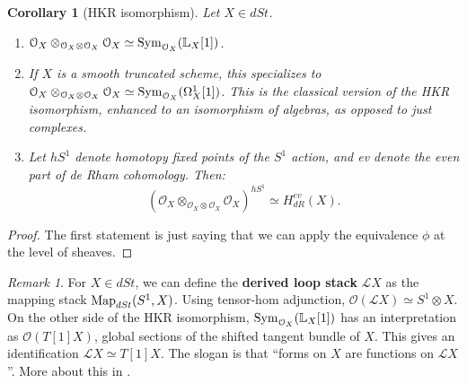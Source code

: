 \documentclass[10pt,a4paper,reqno,oneside]{book} %
\theoremstyle{plain}
\newtheorem{cor}[thm]{Corollary}
\theoremstyle{definition}
\theoremstyle{remark}
\newtheorem{rem}[thm]{Remark}
\numberwithin{equation}{section}
\begin{document}
\begin{cor}[HKR isomorphism]
\label{cor:HKR}
Let $X \in dSt$. 
\begin{enumerate}
\item $\mathcal{O}_X \otimes_{\mathcal{O}_X\otimes\mathcal{O}_X} \mathcal{O}_X \simeq \operatorname{Sym}_{\mathcal{O}_X} (\mathbb L_X[1])$.
\item If $X$ is a smooth truncated scheme, this specializes to $\mathcal{O}_X \otimes_{\mathcal{O}_X\otimes\mathcal{O}_X} 
\mathcal{O}_X \simeq \operatorname{Sym}_{\mathcal{O}_X} (\Omega^1_X[1])$. This is the classical version of the HKR isomorphism, enhanced
to an isomorphism of algebras, as opposed to just complexes.
\item Let $hS^1$ denote homotopy fixed points of the $S^1$ action, and ev denote the even part of de Rham cohomology. Then:
\[	(\mathcal{O}_X \otimes_{\mathcal{O}_X\otimes\mathcal{O}_X} \mathcal{O}_X)^{hS^1} \simeq H_{dR}^{ev}(X).	\]
\end{enumerate}
\end{cor}
\begin{proof}
The first statement is just saying that we can apply the equivalence $\phi$ at the level of sheaves.
\end{proof}

\begin{rem}
\label{rem:loop_stack}
For $X \in dSt$, we can define the \textbf{derived loop stack} $\mathscr{L}X$ as the mapping stack $\operatorname{Map}_{dSt}(S^1,X)$.
Using tensor-hom adjunction, $\mathcal{O}(\mathscr{L}X) \simeq S^1 \otimes X$. On the other side of the HKR
isomorphism, $\operatorname{Sym}_{\mathcal{O}_X} (\mathbb L_X[1])$ has an interpretation as $\mathcal{O}(T[1]X)$, global sections of the
shifted tangent bundle of $X$. This gives an identification $\mathscr{L}X \simeq T[1]X$. 
The slogan is that ``forms on $X$ are functions on $\mathcal{L}X$''. More about this in \cite{BZN_loop}.
\end{rem}
\end{document}
